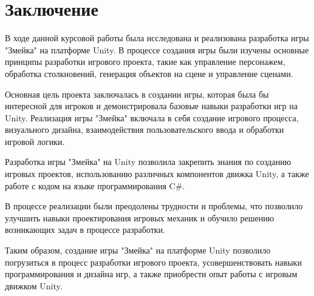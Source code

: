 \documentclass[14pt, oneside]{altsu-report}
\begin{document}
\chapter*{Заключение}

В ходе данной курсовой работы была исследована и реализована разработка игры "Змейка" на платформе Unity. В процессе создания игры были изучены основные принципы разработки игрового проекта, такие как управление персонажем, обработка столкновений, генерация объектов на сцене и управление сценами.

Основная цель проекта заключалась в создании игры, которая была бы интересной для игроков и демонстрировала базовые навыки разработки игр на Unity. Реализация игры "Змейка" включала в себя создание игрового процесса, визуального дизайна, взаимодействия пользовательского ввода и обработки игровой логики.

Разработка игры "Змейка" на Unity позволила закрепить знания по созданию игровых проектов, использованию различных компонентов движка Unity, а также работе с кодом на языке программирования C\#.

В процессе реализации были преодолены трудности и проблемы, что позволило улучшить навыки проектирования игровых механик и обучило решению возникающих задач в процессе разработки.

Таким образом, создание игры "Змейка" на платформе Unity позволило погрузиться в процесс разработки игрового проекта, усовершенствовать навыки программирования и дизайна игр, а также приобрести опыт работы с игровым движком Unity.
\end{document}
